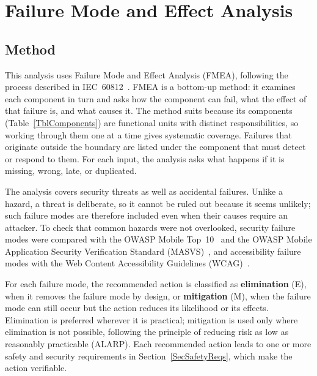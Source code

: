 \documentclass{article}
\begin{document}
\section{Failure Mode and Effect Analysis} \label{SecFMEA}



\subsection{Method} \label{SecFMEAMethod}

This analysis uses Failure Mode and Effect Analysis (FMEA), following the
process described in IEC~60812~\cite{IEC60812}. FMEA is a bottom-up method: it
examines each component in turn and asks how the component can fail, what the
effect of that failure is, and what causes it. The method suits \progname{}
because its components (Table~\ref{TblComponents}) are functional units with
distinct responsibilities, so working through them one at a time gives
systematic coverage. Failures that originate outside the boundary are listed
under the component that must detect or respond to them. For each input, the
analysis asks what happens if it is missing, wrong, late, or duplicated.

The analysis covers security threats as well as accidental failures. Unlike a
hazard, a threat is deliberate, so it cannot be ruled out because it seems
unlikely; such failure modes are therefore included even when their causes
require an attacker. To check that common hazards were not overlooked,
security failure modes were compared with the OWASP Mobile
Top~10~\cite{OWASPMobileTop10} and the OWASP Mobile Application Security
Verification Standard (MASVS)~\cite{OWASPMASVS}, and accessibility failure
modes with the Web Content Accessibility Guidelines (WCAG)~\cite{WCAG22}.

For each failure mode, the recommended action is classified as
\textbf{elimination} (E), when it removes the failure mode by design, or
\textbf{mitigation} (M), when the failure mode can still occur but the action
reduces its likelihood or its effects. Elimination is preferred wherever it is
practical; mitigation is used only where elimination is not possible, following
the principle of reducing risk as low as reasonably practicable (ALARP). Each
recommended action leads to one or more safety and security requirements in
Section~\ref{SecSafetyReqs}, which make the action verifiable.
\end{document}
